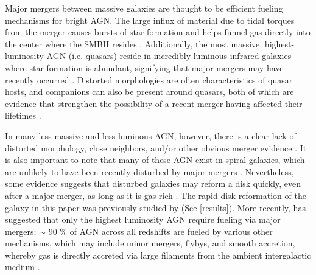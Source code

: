 \documentclass[]{emulateapj}
\begin{document}


Major mergers between massive galaxies are thought to be efficient fueling mechanisms for bright AGN. The large influx of material due to tidal torques from the merger causes bursts of star formation and helps funnel gas directly into the center where the SMBH resides \citep[e.g.][]{Richards2006,Reddy2008,Hopkins2010}. Additionally, the most massive, highest-luminosity AGN (i.e. quasars) reside in incredibly luminous infrared galaxies where star formation is abundant, signifying that major mergers may have recently occurred \citep{Treister2012}. Distorted morphologies are often characteristics of quasar hosts, and companions can also be present around quasars, both of which are evidence that strengthen the possibility of a recent merger having affected their lifetimes \citep{Ellison2010}. 

In many less massive and less luminous AGN, however, there is a clear lack of distorted morphology, close neighbors, and/or other obvious merger evidence \citep{Ryan2007,Schawinski2011,Ellison2013,Hicks2013}. It is also important to note that many of these AGN exist in spiral galaxies, which are unlikely to have been recently disturbed by major mergers \citep{Schawinski2011,Kocevski2011}. Nevertheless, some evidence suggests that disturbed galaxies may reform a disk quickly, even after a major merger, as long as it is gas-rich \citep{vanGorkom1997}. The rapid disk reformation of the galaxy in this paper was previously studied by \cite{Governato2009} (See \ref{results}). More recently, \cite{Treister2012} has suggested that only the highest luminosity AGN require fueling via major mergers; $\sim$ 90 $\%$ of AGN across all redshifts are fueled by various other mechanisms, which may include minor mergers, flybys, and smooth accretion, whereby gas is directly accreted via large filaments from the ambient intergalactic medium \citep{Cox2006,Bellovary2013,Sinha2012,Dubois2012,DiMatteo2016}.
\end{document}
